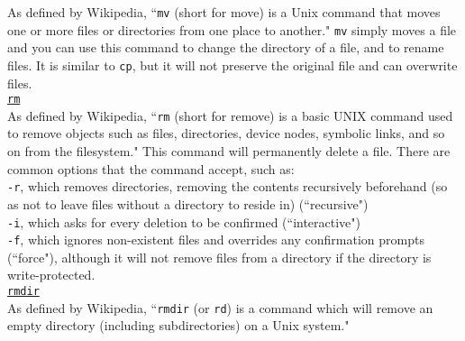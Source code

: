 \documentclass[12pt]{article}
\begin{document}
\begin{enumerate} [label=(\alph*)]
	As defined by Wikipedia, ``\texttt{mv} (short for move) is a Unix command that moves one or more files or directories from one place to another." \texttt{mv} simply moves a file and you can use this command to change the directory of a file, and to rename files. It is similar to \texttt{cp}, but it will not preserve the original file and can overwrite files.\\
	\underline{\texttt{rm}} \\
	As defined by Wikipedia, ``\texttt{rm} (short for remove) is a basic UNIX command used to remove objects such as files, directories, device nodes, symbolic links, and so on from the filesystem." This command will permanently delete a file. There are common options that the command accept, such as: \\
	 \texttt{-r}, which removes directories, removing the contents recursively beforehand (so as not to leave files without a directory to reside in) (``recursive") \\
	\texttt{-i}, which asks for every deletion to be confirmed (``interactive") \\
	\texttt{-f}, which ignores non-existent files and overrides any confirmation prompts (``force"), although it will not remove files from a directory if the directory is write-protected.\\
	\underline{\texttt{rmdir}} \\
	As defined by Wikipedia, ``\texttt{rmdir} (or \texttt{rd}) is a command which will remove an empty directory (including subdirectories) on a Unix system."
 \end{enumerate} 
\end{document}
